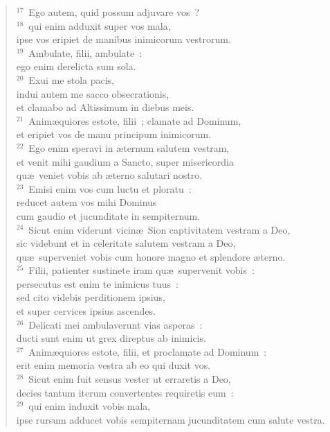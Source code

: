 \begin{verse}
${}^{17}$~Ego autem, quid possum adjuvare vos~?\\
${}^{18}$~qui enim adduxit super vos mala,\\ ipse vos eripiet de manibus inimicorum vestrorum.\\
${}^{19}$~Ambulate, filii, ambulate~:\\ ego enim derelicta sum sola.\\
${}^{20}$~Exui me stola pacis,\\ indui autem me sacco obsecrationis,\\ et clamabo ad Altissimum in diebus meis.\\
${}^{21}$~Anim\ae quiores estote, filii~; clamate ad Dominum,\\ et eripiet vos de manu principum inimicorum.\\
${}^{22}$~Ego enim speravi in \ae ternum salutem vestram,\\ et venit mihi gaudium a Sancto, super misericordia\\ qu\ae\ veniet vobis ab \ae terno salutari nostro.\\
${}^{23}$~Emisi enim vos cum luctu et ploratu~:\\ reducet autem vos mihi Dominus\\ cum gaudio et jucunditate in sempiternum.\\
${}^{24}$~Sicut enim viderunt vicin\ae\ Sion captivitatem vestram a Deo,\\ sic videbunt et in celeritate salutem vestram a Deo,\\ qu\ae\ superveniet vobis cum honore magno et splendore \ae terno.\\
${}^{25}$~Filii, patienter sustinete iram qu\ae\ supervenit vobis~:\\ persecutus est enim te inimicus tuus~:\\ sed cito videbis perditionem ipsius,\\ et super cervices ipsius ascendes.\\
${}^{26}$~Delicati mei ambulaverunt vias asperas~:\\ ducti sunt enim ut grex direptus ab inimicis.\\
${}^{27}$~Anim\ae quiores estote, filii, et proclamate ad Dominum~:\\ erit enim memoria vestra ab eo qui duxit vos.\\
${}^{28}$~Sicut enim fuit sensus vester ut erraretis a Deo,\\ decies tantum iterum convertentes requiretis eum~:\\
${}^{29}$~qui enim induxit vobis mala,\\ ipse rursum adducet vobis sempiternam jucunditatem cum salute vestra.\end{verse}


